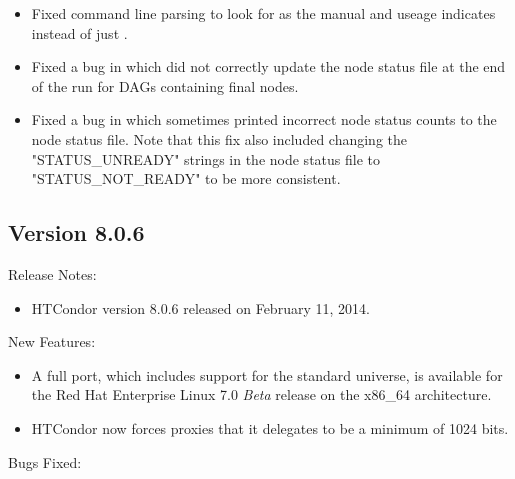 \begin{itemize}

\item Fixed  command line parsing to look for 
as the manual and useage indicates instead of just .

\item Fixed a bug in which  did not correctly update
the node status file at the end of the run for DAGs containing
final nodes.

\item Fixed a bug in which  sometimes printed incorrect
node status counts to the node status file.  Note that this fix also
included changing the "STATUS\_UNREADY" strings in the node status
file to "STATUS\_NOT\_READY" to be more consistent.

\end{itemize}

\subsection*{\label{sec:New-8-0-6}Version 8.0.6}

\noindent Release Notes:

\begin{itemize}

\item HTCondor version 8.0.6 released on February 11, 2014.

\end{itemize}


\noindent New Features:

\begin{itemize}

\item A full port, which includes support for the standard universe,
is available for the Red Hat Enterprise Linux 7.0 \emph{Beta} release
on the x86\_64 architecture.

\item HTCondor now forces proxies that it delegates 
to be a minimum of 1024 bits.

\end{itemize}

\noindent Bugs Fixed:

